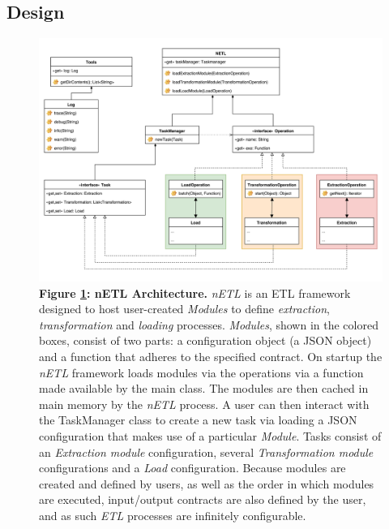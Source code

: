 \subsection{Design}

\begin{figure}[H]
    \centering
    \begin{mdframed}
        \centering
        \includegraphics[scale=0.092]{./resources/figures/netlUML.png}
    \end{mdframed}
    \caption[nETL Architecture]{\textbf{Figure \ref{nETL}: nETL Architecture.} \textit{nETL} is an ETL framework designed to host user-created \textit{Modules} to define \textit{extraction}, \textit{transformation} and \textit{loading} processes. \textit{Modules}, shown in the colored boxes, consist of two parts: a configuration object (a JSON object) and a function that adheres to the specified contract. On startup the \textit{nETL} framework loads modules via the operations via a function made available by the main class. The modules are then cached in main memory by the \textit{nETL} process. A user can then interact with the TaskManager class to create a new task via loading a JSON configuration that makes use of a particular \textit{Module}. Tasks consist of an \textit{Extraction module} configuration, several \textit{Transformation module} configurations and a \textit{Load} configuration. Because modules are created and defined by users, as well as the order in which modules are executed, input/output contracts are also defined by the user, and as such \textit{ETL} processes are infinitely configurable.}
    \label{nETL}
\end{figure}


